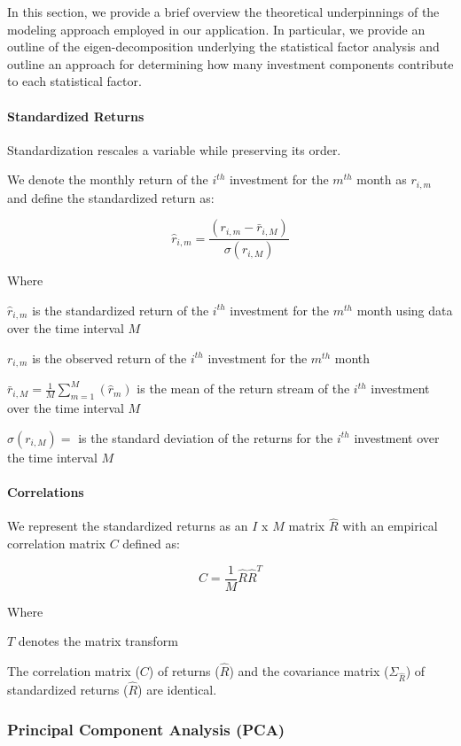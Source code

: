 \documentclass[]{article}
\begin{document}
In this section, we provide a brief overview the theoretical
underpinnings of the modeling approach employed in our application. In
particular, we provide an outline of the eigen-decomposition underlying
the statistical factor analysis and outline an approach for determining
how many investment components contribute to each statistical factor.

\paragraph{Standardized Returns}\label{standardized-returns}

Standardization rescales a variable while preserving its order.

We denote the monthly return of the \(i^{th}\) investment for the
\(m^{th}\) month as \(r_{i,m}\) and define the standardized return as:

\[\hat{r}_{i,m}=\frac{\left( r_{i,m}-\bar{r}_{i,M}\right)}{\sigma(r_{i,M})}\]

Where

\(\hat{r}_{i,m}\) is the standardized return of the \(i^{th}\)
investment for the \(m^{th}\) month using data over the time interval
\(M\)

\(r_{i,m}\) is the observed return of the \(i^{th}\) investment for the
\(m^{th}\) month

\(\bar{r}_{i,M}=\frac{1}{M}\sum_{m=1}^{M}\left(\hat{r}_{m}\right)\) is
the mean of the return stream of the \(i^{th}\) investment over the time
interval \(M\)

\(\sigma(r_{i,M})=\) is the standard deviation of the returns for the
\(i^{th}\) investment over the time interval \(M\)

\paragraph{Correlations}\label{correlations}

We represent the standardized returns as an \(I\) x \(M\) matrix
\(\hat{R}\) with an empirical correlation matrix \(C\) defined as:

\[C = \frac{1}{M}\hat{R}\hat{R}^{T}\]

Where

\(T\) denotes the matrix transform

The correlation matrix (\(C\)) of returns (\(\hat{R}\)) and the
covariance matrix (\(\Sigma_{\hat{R}}\)) of standardized returns
(\(\hat{R}\)) are identical.

\subsubsection{Principal Component Analysis
(PCA)}\label{principal-component-analysis-pca}
\end{document}
